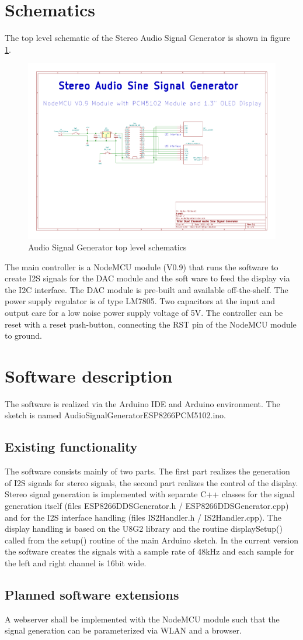 \documentclass[11pt, oneside]{scrartcl}   	%
\begin{document}
\section{Schematics}
The top level schematic of the Stereo Audio Signal Generator is shown in figure \ref{fig:toplevelschematic}.
\begin{figure}[tbph]
	\centering
	\includegraphics[width=\linewidth]{AudioSignalGeneratorSchematics.pdf}
	\caption[Audio Signal Generator top level schematics]{Audio Signal Generator top level schematics}
	\label{fig:toplevelschematic}
\end{figure}
The main controller is a NodeMCU module (V0.9) that runs the software to create I2S signals for the DAC module and the soft
ware to feed the display via the I2C interface. The DAC module is pre-built and available off-the-shelf. The 
power supply regulator is of type LM7805. Two capacitors at the input and output care for a low noise power supply voltage of 5V. The controller can be reset with a reset push-button, connecting the RST pin of the NodeMCU module to ground.
\newpage

\section{Software description}
The software is realized via the Arduino IDE and Arduino environment. The sketch is named AudioSignalGeneratorESP8266PCM5102.ino.

\subsection{Existing functionality}
The software consists mainly of two parts. The first part realizes the generation of I2S signals for stereo signals, the second part realizes the control of the display. Stereo signal generation is implemented with separate C++ classes for the signal generation itself (files ESP8266DDSGenerator.h / ESP8266DDSGenerator.cpp) and for the I2S interface handling (files IS2Handler.h / IS2Handler.cpp). The display handling is based on the U8G2 library and the routine displaySetup() called from the setup() routine of the main Arduino sketch.
In the current version the software creates the signals with a sample rate of 48kHz and each sample for the left and right channel is 16bit wide.

\subsection{Planned software extensions}
A webserver shall be implemented with the NodeMCU module such that the signal generation can be parameterized via WLAN
and a browser.
\end{document}
